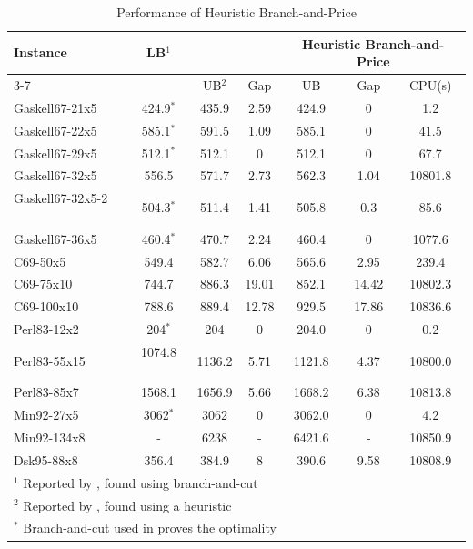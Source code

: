 \begin{table}[ht]
\centering
\caption{Performance of  Heuristic Branch-and-Price}\label{brt-ub}
\begin {tabular}[t]{|l|c|c|c|c|c|c|}  
\hline
Instance & LB$^1$ & \multicolumn{2}{|c|}{\citet{Barreto07}} &  \multicolumn{3}{|c|}{Heuristic Branch-and-Price} \\\cline{3-7}
\mbox{} & \mbox{} & UB$^2$  & Gap & UB & Gap & CPU(s)\\\hline
Gaskell67-21x5	&	424.9$^*$	&	435.9	&	2.59	&	424.9	&	0	&	1.2	\\
Gaskell67-22x5 	&	585.1$^*$	&	591.5	&	1.09	&	585.1     &	0	&	41.5	\\
Gaskell67-29x5 	&	512.1$^*$	&	512.1	&	0	&	512.1	        &	0	&	67.7	\\
Gaskell67-32x5 	&	556.5	        &	571.7	&	2.73	&	562.3	&	1.04	&	10801.8	\\
Gaskell67-32x5-2 \ \ &	504.3$^*$	&	511.4	&	1.41	&       505.8	&	0.3	&	85.6	\\
Gaskell67-36x5 	&	460.4$^*$	&	470.7	&	2.24	&	460.4     &	0	&	1077.6	\\
C69-50x5 	&	549.4	        &	582.7	&	6.06	&	565.6	&	2.95	&	239.4	\\
C69-75x10 	&	744.7	        &	886.3	&	19.01	&	852.1	&	14.42	&	10802.3	\\
C69-100x10 	&	788.6	        &	889.4 &	12.78	&	929.5     	&	17.86	&	10836.6	\\
Perl83-12x2 	&	204$^*$	        &	204	&	0	&	204.0	        &	0	&	0.2	\\
Perl83-55x15 	&	1074.8 \ \	        &	1136.2	&	5.71	&	1121.8  &	4.37	&	10800.0	\\
Perl83-85x7 	&	1568.1	        &	1656.9 &	5.66	&	1668.2	        &	6.38	&	10813.8	\\
Min92-27x5 	&	3062$^*$	&	3062	&	0	&	3062.0	        &	0	&	4.2	\\
Min92-134x8 	&	  -	        &	6238 &	-	&	6421.6	        &	-	&	10850.9	\\
Dsk95-88x8 	&	356.4	        &	384.9 &	8	&	390.6	        &	9.58	&	10808.9	\\
\hline
\multicolumn{7}{l}{$^1$ Reported by \citet{Barreto04}, found using branch-and-cut}\\
\multicolumn{7}{l}{$^2$ Reported by \citet{Barreto07}, found using a heuristic}\\
\multicolumn{7}{l}{$^*$ Branch-and-cut used in \citet{Barreto04} proves the optimality}\\
\end{tabular}
\end{table}

